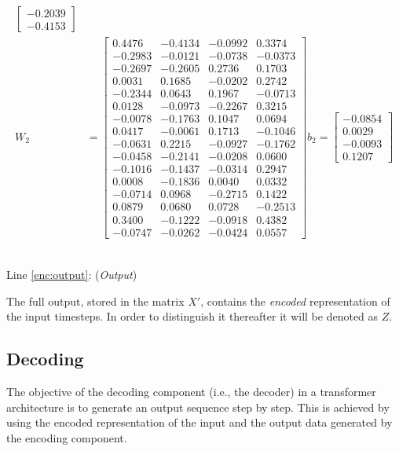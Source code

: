 \documentclass[algorithms,article,submit,pdftex,moreauthors]{Definitions/mdpi}
\begin{document}
\begin{align*}
\begin{bmatrix}
-0.2039 \\
-0.4153
\end{bmatrix} \\
    W_2 &= 
\begin{bmatrix}
 0.4476 & -0.4134 & -0.0992 &  0.3374 \\
-0.2983 & -0.0121 & -0.0738 & -0.0373 \\
-0.2697 & -0.2605 &  0.2736 &  0.1703 \\
 0.0031 &  0.1685 & -0.0202 &  0.2742 \\
-0.2344 &  0.0643 &  0.1967 & -0.0713 \\
 0.0128 & -0.0973 & -0.2267 &  0.3215 \\
-0.0078 & -0.1763 &  0.1047 &  0.0694 \\
 0.0417 & -0.0061 &  0.1713 & -0.1046 \\
-0.0631 &  0.2215 & -0.0927 & -0.1762 \\
-0.0458 & -0.2141 & -0.0208 &  0.0600 \\
-0.1016 & -0.1437 & -0.0314 &  0.2947 \\
 0.0008 & -0.1836 &  0.0040 &  0.0332 \\
-0.0714 &  0.0968 & -0.2715 &  0.1422 \\
 0.0879 &  0.0680 &  0.0728 & -0.2513 \\
 0.3400 & -0.1222 & -0.0918 &  0.4382 \\
-0.0747 & -0.0262 & -0.0424 &  0.0557
\end{bmatrix}
    b_2 = \begin{bmatrix}
    -0.0854 \\ 0.0029 \\ -0.0093 \\ 0.1207
    \end{bmatrix}
\end{align*}

~\\Line \ref{enc:output}: (\textit{Output})

The full output, stored in the matrix $X'$, contains the \textit{encoded} representation of the input timesteps. In order to distinguish it thereafter it will be denoted as $Z$. 

\subsection{Decoding} \label{subsec:decoding}

The objective of the decoding component (i.e., the decoder) in a transformer architecture is to generate an output sequence step by step. This is achieved by using the encoded representation of the input and the output data generated by the encoding component.
\end{document}
